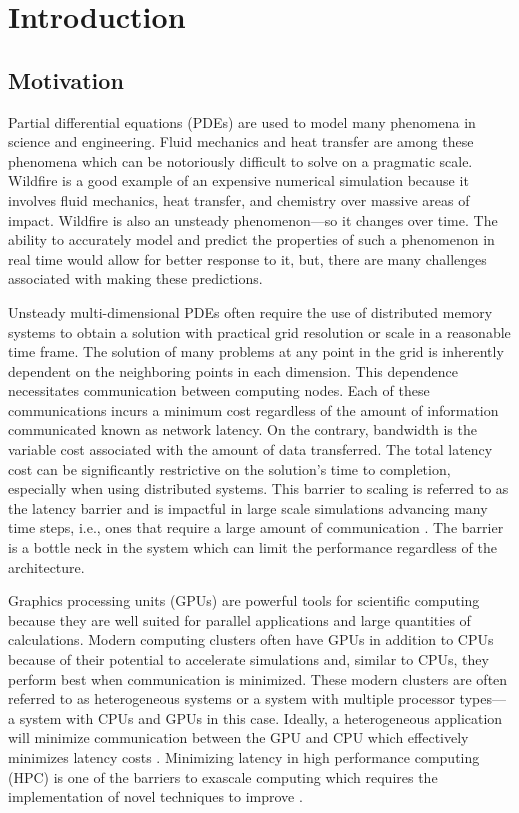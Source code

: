 \documentclass[journal,article,submit,moreauthors,pdftex]{Definitions/mdpi}
\begin{document}
\section{Introduction}
\subsection{Motivation}
Partial differential equations (PDEs) are used to model many phenomena in science and engineering. Fluid mechanics and heat transfer are among these phenomena which can be notoriously difficult to solve on a pragmatic scale. Wildfire is a good example of an expensive numerical simulation because it involves fluid mechanics, heat transfer, and chemistry over massive areas of impact. Wildfire is also an unsteady phenomenon---so it changes over time. The ability to accurately model and predict the properties of such a phenomenon in real time would allow for better response to it, but, there are many challenges associated with making these predictions.

Unsteady multi-dimensional PDEs often require the use of distributed memory systems to obtain a solution with practical grid resolution or scale in a reasonable time frame. The solution of many problems at any point in the grid is inherently dependent on the neighboring points in each dimension. This dependence necessitates communication between computing nodes. Each of these communications incurs a minimum cost regardless of the amount of information communicated known as network latency. On the contrary, bandwidth is the variable cost associated with the amount of data transferred. The total latency cost can be significantly restrictive on the solution's time to completion, especially when using distributed systems. This barrier to scaling is referred to as the latency barrier and is impactful in large scale simulations advancing many time steps, i.e., ones that require a large amount of communication \cite{Alhubail2016ThePDEs}. The barrier is a bottle neck in the system which can limit the performance regardless of the architecture.

\par
Graphics processing units (GPUs) are powerful tools for scientific computing because they are well suited for parallel applications and large quantities of calculations. Modern computing clusters often have GPUs in addition to CPUs because of their potential to accelerate simulations and, similar to CPUs, they perform best when communication is minimized. These modern clusters are often referred to as heterogeneous systems or a system with multiple processor types---a system with CPUs and GPUs in this case. Ideally, a heterogeneous application will minimize communication between the GPU and CPU which effectively minimizes latency costs \cite{OanceaGPGPUCOMPUTING}. Minimizing latency in high performance computing (HPC) is one of the barriers to exascale computing which requires the implementation of novel techniques to improve \cite{Alexandrov2016RouteSkills}.
\end{document}
